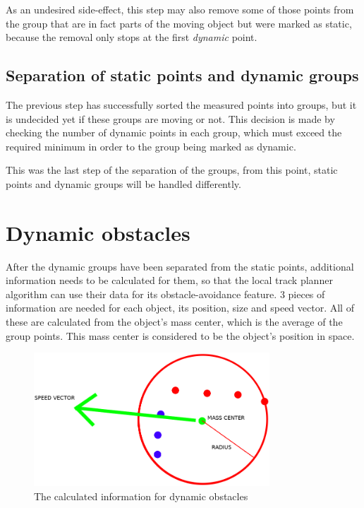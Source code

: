 As an undesired side-effect, this step may also remove some of those points from the group that are in fact parts of the moving object but were marked as static, because the removal only stops at the first \textit{dynamic} point.

\subsection{Separation of static points and dynamic groups}

The previous step has successfully sorted the measured points into groups, but it is undecided yet if these groups are moving or not. This decision is made by checking the number of dynamic points in each group, which must exceed the required minimum in order to the group being marked as dynamic.

This was the last step of the separation of the groups, from this point, static points and dynamic groups will be handled differently.

\section{Dynamic obstacles}
After the dynamic groups have been separated from the static points, additional information needs to be calculated for them, so that the local track planner algorithm can use their data for its obstacle-avoidance feature. 3 pieces of information are needed for each object, its position, size and speed vector. All of these are calculated from the object's mass center, which is the average of the group points. This mass center is considered to be the object's position in space.

\begin{figure}[!ht]
    \centering
    \includegraphics[height=50mm]{figures/raw/dynamic_information.png}
    \caption{The calculated information for dynamic obstacles}
    \label{dynamic_information}
\end{figure}

